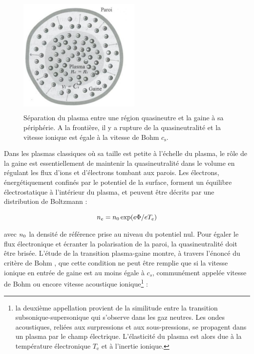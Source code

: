 \begin{refsection}
\begin{figure}[htbp]
\centering
\includegraphics[height=60mm,width=60mm]{figures/1-sheath.jpg}{\caption{Séparation
du plasma entre une région quasineutre et la gaine à sa
périphérie. A la frontière, il y a rupture de la quasineutralité et la vitesse
ionique est égale à la vitesse de Bohm
$c_\text{s}$\parencite{Rax}.}\label{1-gaine1}}
\end{figure}

Dans les plasmas classiques où sa taille est petite
à l'échelle du plasma, le rôle de la gaine est essentiellement de
maintenir la quasineutralité dans le volume en régulant les flux d'ions et
d'électrons tombant aux parois. Les électrons, énergétiquement confinés par le
potentiel de la surface, forment un équilibre électrostatique à l'intérieur du
plasma, et peuvent être décrits par une distribution de Boltzmann :

\begin{equation}
	n_{e}=n{_{0}}\exp(e\Phi/eT_{e})
\end{equation}

avec $n{_{0}}$ la densité de référence prise au niveau du potentiel nul.
Pour égaler le flux électronique et écranter la polarisation de la paroi, la
quasineutralité doit être brisée. L'étude de la transition plasma-gaine montre,
à travers l'énoncé du critère de Bohm \parencite{Stangeby}, que
cette condition ne peut être remplie que si la vitesse ionique en entrée de
gaine est au moins égale à $c_s$, communément appelée vitesse de Bohm ou encore
vitesse acoustique ionique\footnote{la deuxième appellation provient de la similitude entre la
transition subsonique-supersonique qui s'observe dans les gaz neutres. Les
ondes acoustiques, reliées aux surpressions et aux sous-pressions, se propagent
dans un plasma par le champ électrique. L'élasticité du plasma est alors due à
la température électronique $T_\text{e}$ et à l'inertie ionique.} :


\end{refsection}
